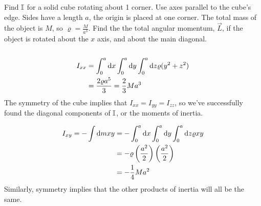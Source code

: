 \documentclass[a4paper]{article}
\begin{document}
\begin{eg}
	Find $\mathbb{I}$ for a solid cube rotating about 1 corner. Use axes
	parallel to the cube's edge. Sides have a length $a$, the origin is
	placed at one corner. The total mass of the object is $M$, so
	$\varrho = \frac{M}{a^3}$. Find the the total angular momentum,
	$\vec{L}$, if the object is rotated about the $x$ axis, and about the
	main diagonal.\\~\\

	\begin{align*}
		I_{xx}&=\int_0^a\mathrm{d} x\int_0^a\mathrm{d} y\int_0^a\mathrm{d} z\varrho(y^2+z^2)\\
		      &= \frac{2\varrho a^5}{3} = \frac{2}{3}Ma^3
	\end{align*}
	The symmetry of the cube implies that $I_{xx} = I_{yy} = I_{zz}$, so
	we've successfully found the diagonal components of $\mathbb{I}$, or the
	moments of inertia.

	\begin{align*}
		I_{xy} = -\int\mathrm{d} m xy &= -\int_0^a\mathrm{d} x\int_0^a\mathrm{d} y\int_0^a\mathrm{d} z
		\varrho xy\\
		&=-\varrho\left(\frac{a^2}{2}\right)\left(\frac{a^2}{2}\right)\\
		&= -\frac{1}{4}Ma^2
	\end{align*}
	Similarly, symmetry implies that the other products of inertia will all
	be the same.


\end{eg}
\end{document}
